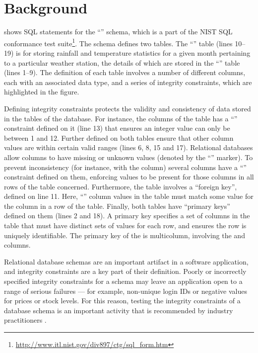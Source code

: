 
\section{Background}
\label{sec:background}



 shows SQL  statements for the ``\NistWeather'' schema, which is a part of the NIST SQL conformance test suite\footnote{\url{http://www.itl.nist.gov/div897/ctg/sql_form.htm}}. The schema defines two tables. The ``'' table (lines 10--19) is for storing rainfall and temperature statistics for a given month pertaining to a particular weather station, the details of which are stored in the ``'' table (lines 1--9). The definition of each table involves a number of different columns, each with an associated data type, and a series of integrity constraints, which are highlighted in the figure. 

Defining integrity constraints protects the validity and consistency of data stored in the tables of the database. For instance, the  columns of the  table has a ``\CHECK'' constraint defined on it (line 13) that ensures an integer  value can only be between 1 and 12. Further \CCs defined on both tables ensure that other column values are within certain valid ranges (lines 6, 8, 15 and 17). Relational databases allow columns to have missing or unknown values (denoted by the ``\NULL'' marker). To prevent inconsistency (for instance, with the  column) several columns have a ``\NOTNULL'' constraint defined on them, enforcing values to be present for those columns in all rows of the table concerned.
Furthermore, the  table involves a ``foreign key'', defined on line 11. Here, ``'' column values in the  table must match some value 
for the  column in a row of the  table. Finally, both tables have ``primary keys'' defined on them (lines 2 and 18). A primary key specifies a set of columns in the table that must have distinct sets of values for each row, and ensures the row is uniquely identifiable. 
The primary key of the  is multicolumn, involving the  and  columns.

Relational database schemas are an important artifact in a software application, and integrity constraints are a key part of their definition. Poorly or incorrectly specified integrity constraints for a schema may leave an application open to a range of serious failures --- for example, non-unique login IDs or negative values for prices or stock levels. For this reason, testing the integrity constraints of a database schema is an important activity that is recommended by industry practitioners \cite{DzoneDatabaseTesting}.

